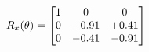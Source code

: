 \documentclass[preview]{standalone}
\begin{document}
\begin{align*}
\special{dvisvgm:raw <g id='unique000'>}R_{x}(\theta) = \begin{bmatrix}1 & 0 & 0 \\0 & -0.91 & +0.41 \\0 & -0.41 & -0.91\end{bmatrix}\special{dvisvgm:raw </g>}
\end{align*}
\end{document}
